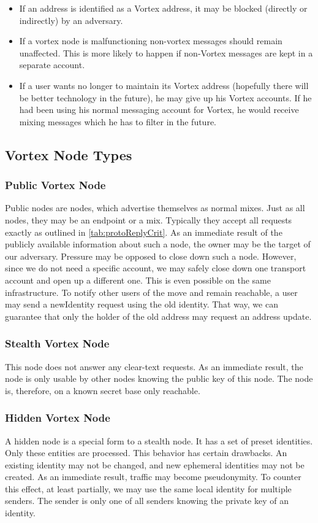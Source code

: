 \begin{itemize}
	\item If an address is identified as a Vortex address, it may be blocked (directly or indirectly) by an adversary.
	\item If a vortex node is malfunctioning non-vortex messages should remain unaffected. This is more likely to happen if non-Vortex messages are kept in a separate account.
	\item If a user wants no longer to maintain its Vortex address (hopefully there will be better technology in the future), he may give up his Vortex accounts. If he had been using his normal messaging account for Vortex, he would receive mixing messages which he has to filter in the future.
\end{itemize}

\subsection{Vortex Node Types}

\subsubsection{Public Vortex Node}
Public nodes are nodes, which advertise themselves as normal mixes. Just as all nodes, they may be an endpoint or a mix. Typically they accept all requests exactly as outlined in \ref{tab:protoReplyCrit}. As an immediate result of the publicly available information about such a node, the owner may be the target of our adversary. Pressure may be opposed to close down such a node. However, since we do not need a specific account, we may safely close down one transport account and open up a different one. This is even possible on the same infrastructure. To notify other users of the move and remain reachable, a user may send a newIdentity request using the old identity. That way, we can guarantee that only the holder of the old address may request an address update.

\subsubsection{Stealth Vortex Node\label{sec:stealthNode}}
This node does not answer any clear-text requests. As an immediate result, the node is only usable by other nodes knowing the public key of this node. The node is, therefore, on a known secret base only reachable.

\subsubsection{Hidden Vortex Node\label{sec:hiddenNode}}
A hidden node is a special form to a stealth node. It has a set of preset identities. Only these entities are processed. This behavior has certain drawbacks. An existing identity may not be changed, and new ephemeral identities may not be created. As an immediate result, traffic may become pseudonymity. To counter this effect, at least partially, we may use the same local identity for multiple senders. The sender is only one of all senders knowing the private key of an identity.

